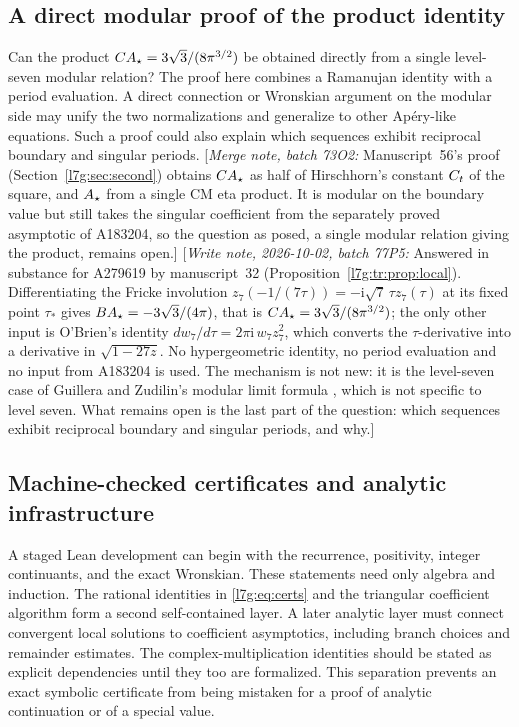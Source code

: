 \documentclass[11pt,letterpaper]{article}
\theoremstyle{remark}\newtheorem{remark}[theorem]{Remark}
\newcommand{\ii}{\mathrm i}\newcommand{\ee}{\mathrm e}
\newcommand{\mergenote}[1]{\textup{[}\emph{Merge note, batch 73O2:} #1\textup{]}}
\newcommand{\writenote}[1]{\textup{[}\emph{Write note, 2026-10-02, batch 77P5:} #1\textup{]}}
\newcounter{l7gtrsavedeq}
\begin{document}
\subsection{A direct modular proof of the product identity}\label{l7g:tr:sec:product}
Can the product $CA_\star=3\sqrt3/(8\pi^{3/2})$ be obtained directly from a
single level-seven modular relation? The proof here combines a
Ramanujan identity with a period evaluation. A direct connection or
Wronskian argument on the modular side may unify the two normalizations
and generalize to other Ap\'ery-like equations. Such a proof could also
explain which sequences exhibit reciprocal boundary and singular
periods.
\mergenote{Manuscript~56's proof (Section~\ref{l7g:sec:second}) obtains
$CA_\star$ as half of Hirschhorn's constant $C_{t}$ of the square, and $A_\star$ from
a single CM eta product. It is modular on the boundary value but still
takes the singular coefficient from the separately proved asymptotic of
A183204, so the question as posed, a single modular relation giving the
product, remains open.}
\writenote{Answered in substance for A279619 by manuscript~32
(Proposition~\ref{l7g:tr:prop:local}). Differentiating the Fricke
involution $z_7(-1/(7\tau))=-\ii\sqrt7\,\tau z_7(\tau)$ at its fixed point
$\tau_*$ gives $BA_\star=-3\sqrt3/(4\pi)$, that is
$CA_\star=3\sqrt3/(8\pi^{3/2})$; the only other input is O'Brien's identity
$dw_7/d\tau=2\pi\ii\,w_7z_7^2$, which converts the $\tau$-derivative into a
derivative in $\sqrt{1-27z}$. No hypergeometric identity, no period
evaluation and no input from A183204 is used. The mechanism is not new: it
is the level-seven case of Guillera and Zudilin's modular limit formula
\cite[eq.~(27)]{l7g:tr:gz}, which is not specific to level seven. What
remains open is the last part of the question: which sequences exhibit
reciprocal boundary and singular periods, and why.}

\subsection{Machine-checked certificates and analytic infrastructure}\label{l7g:sec:formal}
A staged Lean development can begin with the recurrence, positivity,
integer continuants, and the exact Wronskian. These statements need only
algebra and induction. The rational identities in
\eqref{l7g:eq:certs} and the triangular coefficient algorithm form a second
self-contained layer. A later analytic layer must connect convergent
local solutions to coefficient asymptotics, including branch choices
and remainder estimates. The complex-multiplication identities should
be stated as explicit dependencies until they too are formalized.
This separation prevents an exact symbolic certificate from being
mistaken for a proof of analytic continuation or of a special value.
\end{document}
